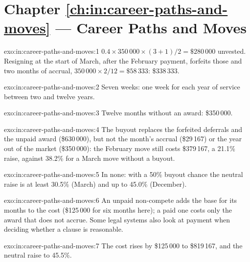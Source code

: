 \section*{Chapter \ref{ch:in:career-paths-and-moves} --- Career Paths and Moves}

\begin{solution}{exo:in:career-paths-and-moves:1}
$0.4\times350\,000\times(3+1)/2=\$280\,000$ unvested. Resigning at the start of March, after the February payment,
forfeits those and two months of accrual, $350\,000\times2/12=\$58\,333$: \$338\,333.
\end{solution}

\begin{solution}{exo:in:career-paths-and-moves:2}
Seven weeks: one week for each year of service between two and twelve years.
\end{solution}

\begin{solution}{exo:in:career-paths-and-moves:3}
Twelve months without an award: \$350\,000.
\end{solution}

\begin{solution}{exo:in:career-paths-and-moves:4}
The buyout replaces the forfeited deferrals and the unpaid award (\$630\,000), but not the month's accrual
(\$29\,167) or the year out of the market (\$350\,000): the February move still costs \$379\,167, a 21.1\% raise,
against 38.2\% for a March move without a buyout.
\end{solution}

\begin{solution}{exo:in:career-paths-and-moves:5}
In none: with a 50\% buyout chance the neutral raise is at least 30.5\% (March) and up to 45.0\% (December).
\end{solution}

\begin{solution}{exo:in:career-paths-and-moves:6}
An unpaid non-compete adds the base for its months to the cost (\$125\,000 for six months here); a paid one costs only
the award that does not accrue. Some legal systems also look at payment when deciding whether a clause is reasonable.
\end{solution}

\begin{solution}{exo:in:career-paths-and-moves:7}
The cost rises by \$125\,000 to \$819\,167, and the neutral raise to 45.5\%.
\end{solution}

